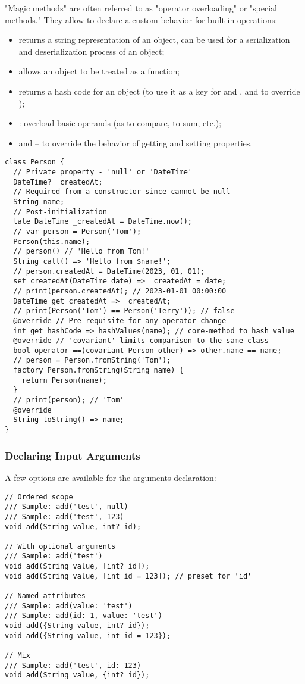 "Magic methods" are often referred to as "operator overloading" or "special methods." They allow to declare a custom 
behavior for built-in operations:

\begin{itemize}
  \item {} returns a string representation of an object, can be used for a serialization and deserialization 
  process of an object;
  \item {} allows an object to be treated as a function;
  \item {} returns a hash code for an object (to use it as a key for  and , and to override \q{==});
  \item {}: overload basic operands (as \q{==} to compare, \q{+} to sum, etc.);
  \item {} and  -- to override the behavior of getting and setting properties.
\end{itemize}

\begin{lstlisting}
class Person {
  // Private property - 'null' or 'DateTime'
  DateTime? _createdAt;
  // Required from a constructor since cannot be null
  String name;
  // Post-initialization
  late DateTime _createdAt = DateTime.now();
  // var person = Person('Tom');
  Person(this.name);
  // person() // 'Hello from Tom!'
  String call() => 'Hello from $name!';
  // person.createdAt = DateTime(2023, 01, 01);
  set createdAt(DateTime date) => _createdAt = date;
  // print(person.createdAt); // 2023-01-01 00:00:00
  DateTime get createdAt => _createdAt;
  // print(Person('Tom') == Person('Terry')); // false
  @override // Pre-requisite for any operator change
  int get hashCode => hashValues(name); // core-method to hash value
  @override // 'covariant' limits comparison to the same class
  bool operator ==(covariant Person other) => other.name == name;
  // person = Person.fromString('Tom');
  factory Person.fromString(String name) {
    return Person(name);
  }
  // print(person); // 'Tom'
  @override
  String toString() => name;
}
\end{lstlisting}


\subsubsection{Declaring Input Arguments}

A few options are available for the arguments declaration:

\begin{lstlisting}
// Ordered scope
/// Sample: add('test', null) 
/// Sample: add('test', 123) 
void add(String value, int? id);

// With optional arguments
/// Sample: add('test')
void add(String value, [int? id]);
void add(String value, [int id = 123]); // preset for 'id'

// Named attributes
/// Sample: add(value: 'test')
/// Sample: add(id: 1, value: 'test')
void add({String value, int? id});
void add({String value, int id = 123});

// Mix
/// Sample: add('test', id: 123)
void add(String value, {int? id});
\end{lstlisting}

